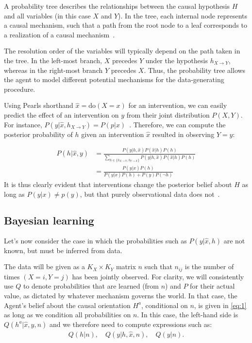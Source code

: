 \documentclass[letterpaper]{article} %
\newcommand{\doo}{\textrm{do}}
\newcommand{\prob}{ P }
\begin{document}
A probability tree describes the relationships between the causal hypothesis $H$ and all variables (in this case $X$ and $Y$). In the tree, each internal node represents a causal mechanism, such that a path from the root node to a leaf corresponds to a realization of a causal mechanism~\cite{ortega2015subjectivity}.

The resolution order of the variables will typically depend on the path taken in the tree. In the left-most branch, $X$ precedes $Y$ under the hypothesis $h_{X\rightarrow Y}$, whereas in the right-most branch $Y$ precedes $X$. Thus, the probability tree allows the agent to model different potential mechanisms for the data-generating procedure. 

Using Pearls shorthand $\hat x = \doo(X=x)$ for an intervention, we can easily predict the effect of an intervention on $y$ from their joint distribution $P(X,Y)$. For instance, $P(y | \hat x, h_{X \rightarrow Y}) = P(p |x)$~\cite{genewein2020algorithms}. Therefore, we can compute the posterior probability of $h$ given an intervention $\hat x$ resulted in observing $Y=y$: %

\begin{align}
	\prob(h|\hat{x},y)
	&= \frac{\prob(y|h,\hat{x})\prob(\hat{x}|h)\prob(h)}
	{ \sum_{h \in \{ h_{X \rightarrow Y}, h_{Y\rightarrow X}\} } \prob(y|h,\hat{x})\prob(\hat{x}|h)\prob(h) }\nonumber  \\  
	& = \frac{P(y | x)P(h) }{ P(y|x)P(h) + P(y  ) P(\neg h) } \label{eq:1}
\end{align}
It is thus clearly evident that interventions change the posterior belief about $H$ as long as $P(y | x) \neq p(y)$, but that purely observational data does not~\cite{ortega2015subjectivity}.






\subsection{Bayesian learning}
Let's now consider the case in which the probabilities such as $P(y | \hat x, h)$ are not known, but must be inferred from data. 

The data will be given as a $K_X \times K_Y$ matrix $n$ such that $n_{ij}$ is the number of times $(X = i, Y=j)$ has been jointly observed. For clarity, we will consistently use $Q$ to denote probabilities that are learned (from $n$) and $P$ for their actual value, as dictated by whatever mechanism governs the world. In that case, the Agent's belief about the causal orientation $H^a$, conditional on $n$, is given in \cref{eq:1} as long as we condition all probabilities on $n$. In this case, the left-hand side is $Q(h^a | \hat x, y, n)$ and we therefore need to compute expressions such as:
\begin{align}
Q(h  | n), \quad Q(y  | h, \hat x, n), \quad Q(y  | n).
\end{align}
\end{document}
